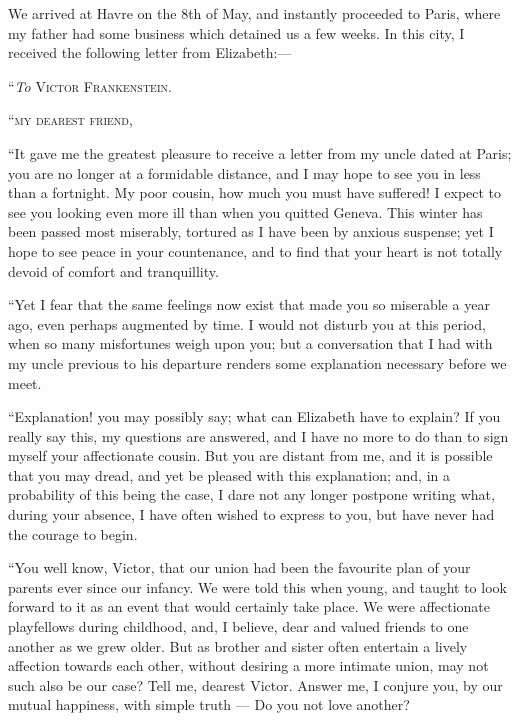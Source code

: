 We arrived at Havre on the 8th of
May, and instantly proceeded to Paris,
where my father had some business
which detained us a few weeks. In
this city, I received the following letter
from Elizabeth:---

\bigskip
\noindent ``\emph{To} \textsc{Victor Frankenstein}.
\medskip

\noindent ``\textsc{my dearest friend},
\medskip

``It gave me the greatest pleasure to
receive a letter from my uncle dated at
Paris; you are no longer at a formidable
distance, and I may hope to see
you in less than a fortnight. My poor
cousin, how much you must have suffered!
I expect to see you looking even
more ill than when you quitted Geneva.
This winter has been passed most
miserably, tortured as I have been
by anxious suspense; yet I hope to
see peace in your countenance, and
to find that your heart is not
totally devoid of comfort and tranquillity.

``Yet I fear that the same feelings
now exist that made you so miserable a
year ago, even perhaps augmented by
time. I would not disturb you at this
period, when so many misfortunes weigh
upon you; but a conversation that I had
with my uncle previous to his departure
renders some explanation necessary
before we meet.

``Explanation! you may possibly
say; what can Elizabeth have to explain?
If you really say this, my questions
are answered, and I have no more
to do than to sign myself your affectionate
cousin. But you are distant
from me, and it is possible that you
may dread, and yet be pleased with
this explanation; and, in a probability
of this being the case, I dare not any
longer postpone writing what, during
your absence, I have often wished to
express to you, but have never had the
courage to begin.

``You well know, Victor, that our
union had been the favourite plan of
your parents ever since our infancy.
We were told this when young, and
taught to look forward to it as an event
that would certainly take place. We
were affectionate playfellows during
childhood, and, I believe, dear and
valued friends to one another as we
grew older. But as brother and sister
often entertain a lively affection towards
each other, without desiring a
more intimate union, may not such also
be our case? Tell me, dearest Victor.
Answer me, I conjure you, by our
mutual happiness, with simple truth --- Do
you not love another?

